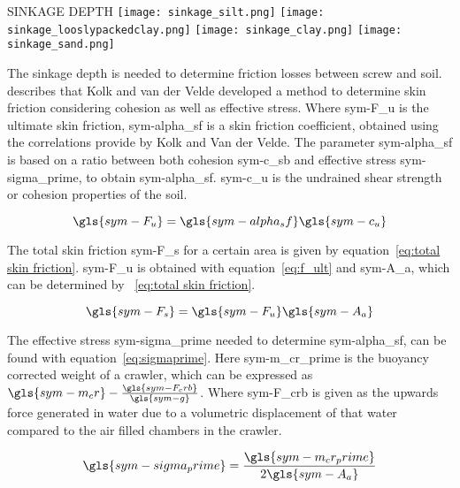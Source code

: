\begin{RoyalFigure}[!htb, label=fig:sinkage depths]{SINKAGE DEPTH}
    \texttt{[image: sinkage\_silt.png]}
    \texttt{[image: sinkage\_looslypackedclay.png]}
    \texttt{[image: sinkage\_clay.png]}
    \texttt{[image: sinkage\_sand.png]}
\end{RoyalFigure}

The sinkage depth is needed to determine friction losses between screw and soil. \citet{rajapakse_geotechnical_2011}
describes that Kolk and van der Velde developed a method to determine skin friction considering cohesion as well as
effective stress. Where \gls{sym-F_u} is the ultimate skin friction, \gls{sym-alpha_sf} is a skin friction coefficient,
obtained using the correlations provide by Kolk and Van der Velde. The parameter \gls{sym-alpha_sf} is based on a ratio
between both cohesion \gls{sym-c_sb} and effective stress \gls{sym-sigma_prime}, to obtain \gls{sym-alpha_sf}.
\gls{sym-c_u} is the undrained shear strength or cohesion properties of the soil.

\begin{equation}
    \label{eq:f_ult}
    \gls{sym-F_u} = \gls{sym-alpha_sf} \gls{sym-c_u}
\end{equation}

\noindent The total skin friction \gls{sym-F_s} for a certain area is given by equation~\ref{eq:total skin friction}.
\gls{sym-F_u} is obtained with equation~\ref{eq:f_ult} and  \gls{sym-A_a}, which can be determined by~
\ref{eq:total skin friction}.

\begin{equation}
    \label{eq:total skin friction}
    \gls{sym-F_s}  = \gls{sym-F_u} \gls{sym-A_a}
\end{equation}

\noindent The effective stress \gls{sym-sigma_prime} needed to determine  \gls{sym-alpha_sf}, can be found with
equation~\ref{eq:sigmaprime}. Here \gls{sym-m_cr_prime} is the buoyancy corrected weight of a crawler, which can be
expressed as \( \gls{sym-m_cr} - \frac{\gls{sym-F_crb}}{\gls{sym-g}} \). Where \gls{sym-F_crb} is given as the upwards
force generated in water due to a volumetric displacement of that water compared to the air filled chambers in the
crawler.

\begin{equation}
    \label{eq:sigmaprime}
    \gls{sym-sigma_prime} = \frac{\gls{sym-m_cr_prime}}{2 \gls{sym-A_a} }
\end{equation}

